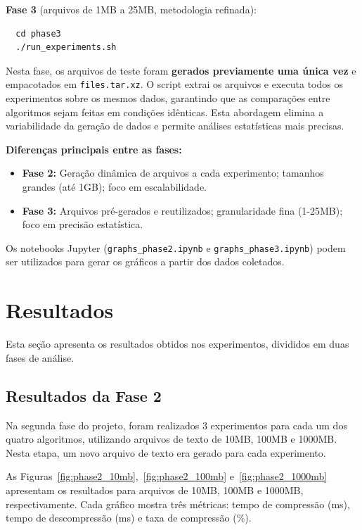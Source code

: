 \documentclass[acmsmall]{acmart}
\begin{document}
\textbf{Fase 3} (arquivos de 1MB a 25MB, metodologia refinada):
\begin{verbatim}
  cd phase3
  ./run_experiments.sh
\end{verbatim}

Nesta fase, os arquivos de teste foram \textbf{gerados previamente uma única vez} e empacotados em \texttt{files.tar.xz}. O script extrai os arquivos e executa todos os experimentos sobre os mesmos dados, garantindo que as comparações entre algoritmos sejam feitas em condições idênticas. Esta abordagem elimina a variabilidade da geração de dados e permite análises estatísticas mais precisas.

\textbf{Diferenças principais entre as fases:}
\begin{itemize}
  \item \textbf{Fase 2:} Geração dinâmica de arquivos a cada experimento; tamanhos grandes (até 1GB); foco em escalabilidade.
  \item \textbf{Fase 3:} Arquivos pré-gerados e reutilizados; granularidade fina (1-25MB); foco em precisão estatística.
\end{itemize}

Os notebooks Jupyter (\texttt{graphs\_phase2.ipynb} e \texttt{graphs\_phase3.ipynb}) podem ser utilizados para gerar os gráficos a partir dos dados coletados.

\section{Resultados}

Esta seção apresenta os resultados obtidos nos experimentos, divididos em duas fases de análise.

\subsection{Resultados da Fase 2}

Na segunda fase do projeto, foram realizados 3 experimentos para cada um dos quatro algoritmos, utilizando arquivos de texto de 10MB, 100MB e 1000MB. Nesta etapa, um novo arquivo de texto era gerado para cada experimento.

As Figuras~\ref{fig:phase2_10mb},~\ref{fig:phase2_100mb} e~\ref{fig:phase2_1000mb} apresentam os resultados para arquivos de 10MB, 100MB e 1000MB, respectivamente. Cada gráfico mostra três métricas: tempo de compressão (ms), tempo de descompressão (ms) e taxa de compressão (\%).
\end{document}
